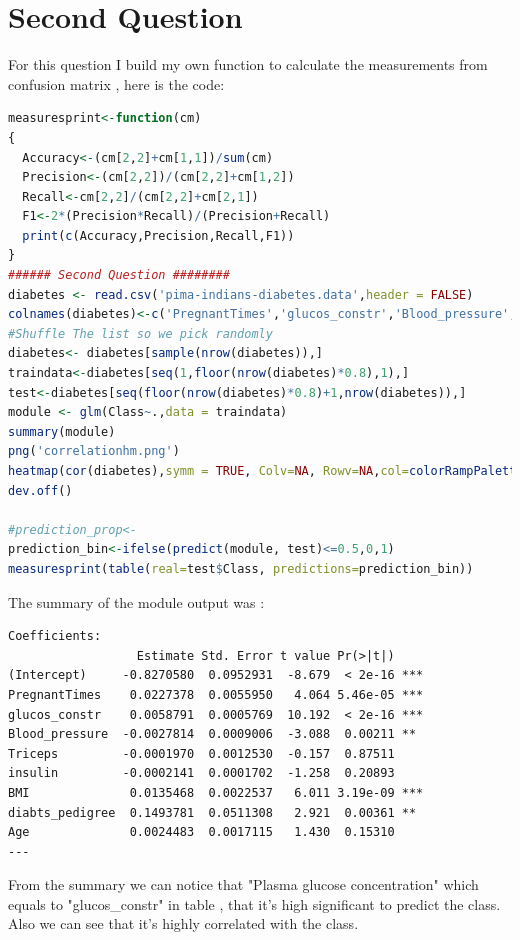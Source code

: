 \documentclass{article}
\begin{document}
\section*{Second Question}
For this question I build my own function to calculate the measurements from confusion matrix , here is the code:
\begin{lstlisting}[language=R]
measuresprint<-function(cm)
{
  Accuracy<-(cm[2,2]+cm[1,1])/sum(cm)
  Precision<-(cm[2,2])/(cm[2,2]+cm[1,2])
  Recall<-cm[2,2]/(cm[2,2]+cm[2,1])
  F1<-2*(Precision*Recall)/(Precision+Recall)
  print(c(Accuracy,Precision,Recall,F1))
}
###### Second Question ########
diabetes <- read.csv('pima-indians-diabetes.data',header = FALSE)
colnames(diabetes)<-c('PregnantTimes','glucos_constr','Blood_pressure','Triceps','insulin','BMI','diabts_pedigree','Age','Class')
#Shuffle The list so we pick randomly 
diabetes<- diabetes[sample(nrow(diabetes)),]
traindata<-diabetes[seq(1,floor(nrow(diabetes)*0.8),1),]
test<-diabetes[seq(floor(nrow(diabetes)*0.8)+1,nrow(diabetes)),]
module <- glm(Class~.,data = traindata)
summary(module)
png('correlationhm.png')
heatmap(cor(diabetes),symm = TRUE, Colv=NA, Rowv=NA,col=colorRampPalette(c("red", "yellow", "green"))(n = 299))
dev.off()

#prediction_prop<-
prediction_bin<-ifelse(predict(module, test)<=0.5,0,1)
measuresprint(table(real=test$Class, predictions=prediction_bin))
\end{lstlisting}
The summary of the module output was :
\begin{lstlisting}
Coefficients:
                  Estimate Std. Error t value Pr(>|t|)    
(Intercept)     -0.8270580  0.0952931  -8.679  < 2e-16 ***
PregnantTimes    0.0227378  0.0055950   4.064 5.46e-05 ***
glucos_constr    0.0058791  0.0005769  10.192  < 2e-16 ***
Blood_pressure  -0.0027814  0.0009006  -3.088  0.00211 ** 
Triceps         -0.0001970  0.0012530  -0.157  0.87511    
insulin         -0.0002141  0.0001702  -1.258  0.20893    
BMI              0.0135468  0.0022537   6.011 3.19e-09 ***
diabts_pedigree  0.1493781  0.0511308   2.921  0.00361 ** 
Age              0.0024483  0.0017115   1.430  0.15310    
---
\end{lstlisting}
From the summary we can notice that "Plasma glucose concentration" which equals to "glucos\_constr" in table , that it's high significant to predict the class. Also we can see that it's highly correlated with the class.
\end{document}
